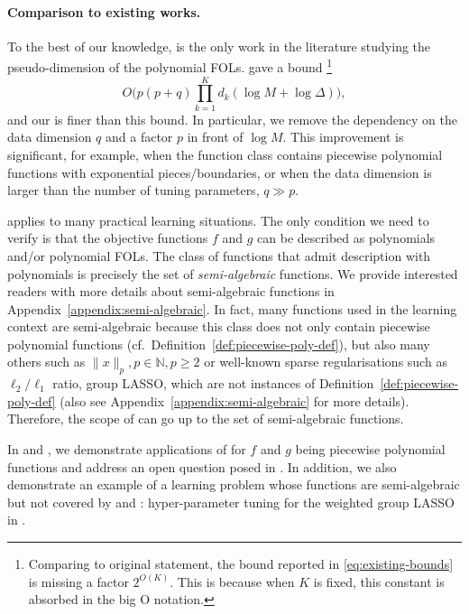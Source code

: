 \documentclass{article}
\theoremstyle{plain}
\theoremstyle{definition}
\theoremstyle{remark}
\newcommand*{\NN}{\mathbb{N}}
\begin{document}
\paragraph{Comparison to existing works.} To the best of our knowledge, \citet{goldberg1993bounding} is the only work in the literature studying the pseudo-dimension of the polynomial FOLs. \citet{goldberg1993bounding} gave a bound \footnote{Comparing to original statement, the bound reported in \eqref{eq:existing-bounds} is missing a factor $2^{O(K)}$. This is because when $K$ is fixed, this constant is absorbed in the big O notation.}
\begin{equation}
    \label{eq:existing-bounds}
    O\big(p(p + q) \prod_{k = 1}^K d_k \left(\log M + \log\Delta\right)\big),
\end{equation}
and our  is finer than this bound.
In particular, we remove the dependency on the data dimension $q$ and a factor $p$ in front of $\log M$. This improvement is significant, for example, when the function class contains piecewise polynomial functions with exponential pieces/boundaries, or when the data dimension is larger than the number of tuning parameters, $q \gg p$.

 applies to many practical learning situations. The only condition we need to verify is that the objective functions $f$ and $g$ can be described as polynomials and/or polynomial FOLs. The class of functions that admit description with polynomials is precisely the set of \emph{semi-algebraic} functions. We provide interested readers with more details about semi-algebraic functions in Appendix~\ref{appendix:semi-algebraic}. In fact, many functions used in the learning context are semi-algebraic because this class does not only contain piecewise polynomial functions (cf.~Definition~\ref{def:piecewise-poly-def}), but also many others such as $\|x\|_p, p \in \NN, p \geq 2$ or well-known sparse regularisations such as $\ell_2/\ell_1$ ratio, group LASSO, which are not instances of Definition~\ref{def:piecewise-poly-def} (also see Appendix~\ref{appendix:semi-algebraic} for more details). Therefore, the scope of  can go up to the set of semi-algebraic functions. 

In  and , we demonstrate applications of  for $f$ and $g$ being piecewise polynomial functions and address an open question posed in \cite{balcan2025sample}.
In addition, we also demonstrate an example of a learning problem whose functions are semi-algebraic but not covered by  and : hyper-parameter tuning for the weighted group LASSO in .
\end{document}
